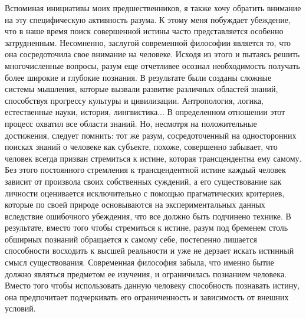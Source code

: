 \documentclass[a5paper,10pt]{article}
\begin{document}
Вспоминая инициативы моих предшественников, я также хочу обратить внимание на
эту специфическую активность разума. К этому меня побуждает убеждение, что в
наше время поиск совершенной истины часто представляется особенно затрудненным.
Несомненно, заслугой современной философии является то, что она сосредоточила
свое внимание на человеке. Исходя из этого и пытаясь решить многочисленные
вопросы, разум еще отчетливее осознал необходимость получать более широкие и
глубокие познания. В результате были созданы сложные системы мышления, которые
вызвали развитие различных областей знаний, способствуя прогрессу культуры и
цивилизации. Антропология, логика, естественные науки, история, лингвистика...
В определенном отношении этот процесс охватил все области знаний. Но, несмотря
на положительные достижения, следует помнить: тот же разум, сосредоточенный на
односторонних поисках знаний о человеке как субъекте, похоже, совершенно
забывает, что человек всегда призван стремиться к истине, которая
трансцендентна ему самому. Без этого постоянного стремления к трансцендентной
истине каждый человек зависит от произвола своих собственных суждений, а его
существование как личности оценивается исключительно с помощью прагматических
критериев, которые по своей природе основываются на экспериментальных данных
вследствие ошибочного убеждения, что все должно быть подчинено технике. В
результате, вместо того чтобы стремиться к истине, разум под бременем столь
обширных познаний обращается к самому себе, постепенно лишается способности
восходить к высшей реальности и уже не дерзает искать истинный смысл
существования. Современная философия забыла, что именно бытие должно являться
предметом ее изучения, и ограничилась познанием человека. Вместо того чтобы
использовать данную человеку способность познавать истину, она предпочитает
подчеркивать его ограниченность и зависимость от внешних условий.
\end{document}
